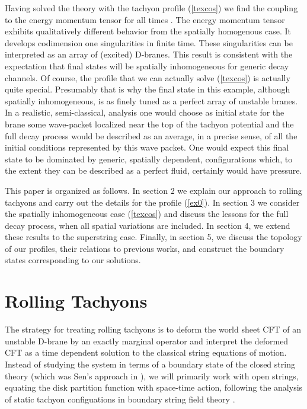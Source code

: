 \documentclass[a4paper,12pt]{article}
\begin{document}
Having solved the theory with the tachyon profile (\ref{texcos}) we find the coupling to the energy momentum tensor for all times \coordHE{}. The energy momentum tensor exhibits qualitatively different behavior from the spatially homogenous case. 
It develops codimension one singularities in finite time. These singularities can be interpreted as an array of (excited) D-branes. 
This result is consistent with the expectation that final states  will be 
spatially inhomogeneous for generic decay channels. Of course, the profile that we can 
actually solve (\ref{texcos}) is actually quite special. Presumably that is why the
final state in this example, although spatially inhomogeneous, is as finely tuned
as a perfect array of unstable branes. 
In a realistic, semi-classical, analysis one would choose as initial state for the brane some 
wave-packet localized near the top of the tachyon potential and the full decay process
would be described as an average, in a precise sense, of all the initial conditions represented
by this wave packet. One would expect this final state to be dominated by generic,
spatially dependent, configurations which, to the extent they can be described as a perfect 
fluid, certainly would have pressure. 







This paper is organized as follows. In section 2 we explain our approach to rolling tachyons and
carry out the details for the profile (\ref{ex0}). In section 3 we consider the spatially inhomogeneous case (\ref{texcos}) and discuss the lessons for the full decay process, 
when all spatial variations are included. In section 4, we extend these results to the 
superstring case. Finally, in section 5,  we  discuss the topology of our profiles, their
relations to previous works, and construct the boundary states 
corresponding to our solutions.


\section{Rolling Tachyons}
The strategy for treating rolling tachyons is to 
deform the world sheet CFT of an unstable D-brane by an exactly marginal operator and interpret the deformed CFT as a time dependent solution 
to the classical string equations of motion. 
Instead of studying the system in terms of a boundary state of the closed string theory (which was Sen's approach in \cite{Sen1,Sen2,senspac}), we will primarily work with open strings, equating the disk partition function with space-time action, following the
analysis of static tachyon configuations in boundary string field theory
\cite{Gerasimov:2000zp}. 
\end{document}
